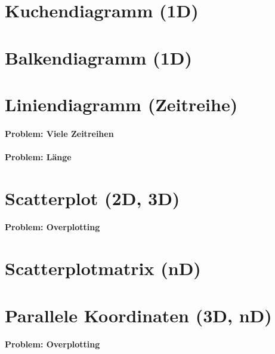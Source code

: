 \documentclass[a4paper, 11pt, accentcolor = tud3b]{tudreport}
\begin{document}
		\section{Kuchendiagramm (1D)} %

		\section{Balkendiagramm (1D)} %

		\section{Liniendiagramm (Zeitreihe)} %

			\paragraph{Problem: Viele Zeitreihen} %

			\paragraph{Problem: Länge} %

		\section{Scatterplot (2D, 3D)} %

			\paragraph{Problem: Overplotting} %

		\section{Scatterplotmatrix (nD)} %

		\section{Parallele Koordinaten (3D, nD)} %

			\paragraph{Problem: Overplotting} %
\end{document}
